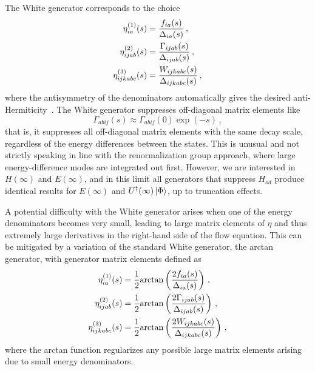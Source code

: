 The White generator corresponds to the choice
\begin{align}
  \eta^{(1)}_{ia}(s) &= \frac{f_{ia}(s)}{\Delta_{ia}(s)}\,,\\
  \eta^{(2)}_{ijab}(s) &= \frac{\Gamma_{ijab}(s)}{\Delta_{ijab}(s)}\,,\\
  \eta^{(3)}_{ijkabc}(s) &= \frac{W_{ijkabc}(s)}{\Delta_{ijkabc}(s)}\,,
\end{align}
where the antisymmetry of the denominators automatically gives the desired anti-Hermiticity~\cite{Whit02generator}.
The White generator suppresses off-diagonal matrix elements like
\begin{equation}
  \Gamma_{abij}(s) \approx \Gamma_{abij}(0) \exp(-s)\,,
\end{equation}
that is, it suppresses all off-diagonal matrix elements with the same decay scale,
regardless of the energy differences between the states.
This is unusual and not strictly speaking in line with the renormalization group approach,
where large energy-difference modes are integrated out first.
However, we are interested in $H(\infty)$ and $E(\infty)$,
and in this limit all generators that suppress $H_{od}$ produce identical results
for $E(\infty)$ and $U^{\dagger}(\infty)\ket{\Phi}$,
up to truncation effects.

A potential difficulty with the White generator arises
when one of the energy denominators becomes very small,
leading to large matrix elements of $\eta$
and thus extremely large derivatives in the right-hand side of the flow equation.
This can be mitigated by a variation of the standard White generator,
the arctan generator,
with generator matrix elements defined as
\begin{align}
  \eta^{(1)}_{ia}(s) &= \frac{1}{2}\text{arctan}\left(\frac{2f_{ia}(s)}{\Delta_{ia}(s)}\right)\,,\\
  \eta^{(2)}_{ijab}(s) &= \frac{1}{2}\text{arctan}\left(\frac{2\Gamma_{ijab}(s)}{\Delta_{ijab}(s)}\right)\,,\\
  \eta^{(3)}_{ijkabc}(s) &= \frac{1}{2}\text{arctan}\left(\frac{2W_{ijkabc}(s)}{\Delta_{ijkabc}(s)}\right)\,,
\end{align}
where the arctan function regularizes any possible large matrix elements arising due to small energy denominators.

